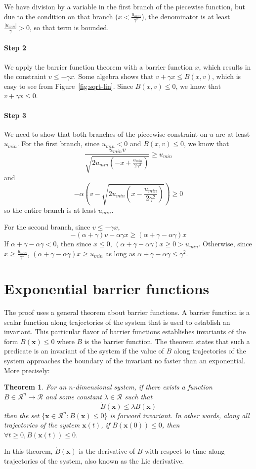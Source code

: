 \documentclass[12pt]{article}
\newtheorem{theorem}{Theorem}
\newcommand{\vecbold}[1]{\boldsymbol{#1}}
\newcommand{\umin}{u_{min}}
\newcommand{\p}{\gamma}
\newcommand{\q}{\alpha}
\begin{document}
We have division by a variable in the first branch of the piecewise function, but due to
the condition on that branch ($x < \frac{\umin}{\p^2}$), the denominator is
at least $\frac{|\umin|}{\p} > 0$, so that term is bounded.

\paragraph*{Step 2}
We apply the barrier function theorem with a barrier function $x$, which
results in the constraint $v \leq -\p x$. Some algebra shows that $v + \p x
\leq B(x,v)$, which is easy to see from Figure~\ref{fig:sqrt-lin}. Since
$B(x,v) \leq 0$, we know that $v + \p x \leq 0$.

\paragraph*{Step 3}
We need to show that both branches of the piecewise constraint on $u$ are
at least $\umin$. For the first branch, since $\umin < 0$ and $B(x,v) \leq 0$, we know that
\[\frac{\umin v}{\sqrt{2\umin(-x + \frac{\umin}{2\p^2})}} \geq \umin\]
and
\[-\q\left(v - \sqrt{2\umin(x - \frac{\umin}{2\p^2})}\right) \geq 0\]
so the entire branch is at least $\umin$.

For the second branch, since $v \leq -\p x$,
\[-(\q + \p) v -\q\p x \geq (\q + \p - \q\p)x\]
If $\q+\p-\q\p < 0$, then since $x \leq 0$, $(\q+\p -\q\p)x \geq 0 >
\umin$. Otherwise, since $x \geq \frac{\umin}{\p^2}$, $(\q+\p -\q\p)x \geq
\umin$ as long as $\q + \p -\q\p \leq \p^2$.

\section{Exponential barrier functions}
The proof uses a general theorem about barrier functions. A barrier
function is a scalar function along trajectories of the system that is used
to establish an invariant. This particular flavor of barrier functions
establishes invariants of the form $B(\vecbold{x}) \leq 0$ where $B$ is the
barrier function. The theorem states that such a predicate is an invariant
of the system if the value of $B$ along trajectories of the system
approaches the boundary of the invariant no faster than an
exponential. More precisely:

\begin{theorem}
For an $n$-dimensional system, if there exists a function $B \in \mathcal{R}^n \rightarrow \mathcal{R}$ and some constant $\lambda \in \mathcal{R}$ such that
\[\dot{B}(\vecbold{x}) \leq \lambda B(\vecbold{x})\]
then the set $\{\vecbold{x} \in \mathcal{R}^n : B(\vecbold{x}) \leq 0\}$ is forward invariant. In other words, along all trajectories of the system $\vecbold{x}(t)$, if $B(\vecbold{x}(0)) \leq 0$, then $\forall t \geq 0, B(\vecbold{x}(t)) \leq 0$.
\label{thm:exp-barrier}
\end{theorem}

In this theorem, $\dot{B}(\vecbold{x})$ is the derivative of $B$ with
respect to time along trajectories of the system, also known as the Lie
derivative.
\end{document}
